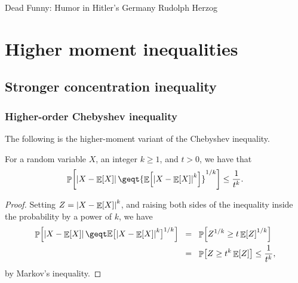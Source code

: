 \makeatletter
{}
\makeatother
\ifx\bookMode\undefined%
\fi
{}


\ChapterPrefix{}
\ChapterGen{}

%
{Dead Funny: Humor in Hitler's Germany}%
{Rudolph Herzog}



\section{Higher moment inequalities}

\subsection{Stronger concentration inequality}

\subsubsection{Higher-order Chebyshev inequality}
The following is the higher-moment variant of the Chebyshev inequality.
\begin{lemma}
    For a random variable $X$, an integer $k \geq 1$, and $t > 0$, we have that
    \begin{equation*}
        \ds%
        \Prob{\cardin{X - \Ex{X}}
           \geq%
           t {\Ex{ \bigl. {\cardin{X -  \Ex{X}}}^k} }^{1/k}}  
        \leq
        \frac{1}{t^k}.
    \end{equation*}
\end{lemma}
\begin{proof}
    Setting $Z = \left| {X - \mathop{\mathbb{E}}\!\left[ {X} \right]} \right|^k$, and 
    raising both sides of the inequality inside the probability by a power of $k$, we have
    \begin{align*}
        \Prob{\cardin{X - \Ex{X}}
           \geq%
           t \ExChar \bigl[ \cardin{X - \Ex{X}}^k \bigr]^{1/k} } %
        &
        \EQ %
      \Prob{Z^{1/k} \geq t \Ex{ Z }^{1/k}}
      \\&
      \EQ%
      \Prob{Z \geq t^k \Ex{Z}}%
      \leq%
      \frac{1}{t^k},
    \end{align*}
    by Markov's inequality.
\end{proof}


